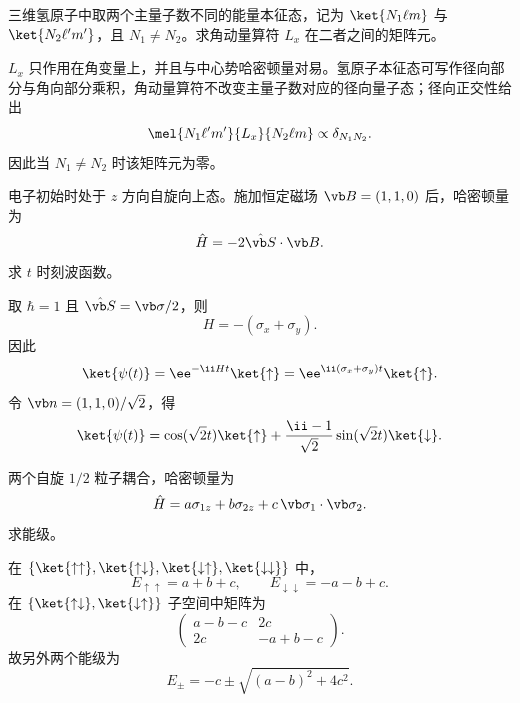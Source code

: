 \begin{question}
三维氢原子中取两个主量子数不同的能量本征态，记为 $\ket{N_1\ell m}$ 与 $\ket{N_2\ell' m'}$，且 $N_1\ne N_2$。求角动量算符 $L_x$ 在二者之间的矩阵元。
\begin{solution}
$L_x$ 只作用在角变量上，并且与中心势哈密顿量对易。氢原子本征态可写作径向部分与角向部分乘积，角动量算符不改变主量子数对应的径向量子态；径向正交性给出
\[
  \mel{N_1\ell'm'}{L_x}{N_2\ell m}\propto \delta_{N_1N_2}.
\]
因此当 $N_1\ne N_2$ 时该矩阵元为零。
\end{solution}
\end{question}

\begin{question}
电子初始时处于 $z$ 方向自旋向上态。施加恒定磁场 $\vb B=(1,1,0)$ 后，哈密顿量为
\[
  \hat H=-2\hat{\vb S}\cdot\vb B.
\]
求 $t$ 时刻波函数。
\begin{solution}
取 $\hbar=1$ 且 $\hat{\vb S}=\vb\sigma/2$，则
\[
  H=-(\sigma_x+\sigma_y).
\]
因此
\[
  \ket{\psi(t)}=\ee^{-\ii Ht}\ket{\uparrow}
  =\ee^{\ii(\sigma_x+\sigma_y)t}\ket{\uparrow}.
\]
令 $\vb n=(1,1,0)/\sqrt2$，得
\[
  \ket{\psi(t)}=\cos(\sqrt2 t)\ket{\uparrow}
  +{\ii-1\over\sqrt2}\sin(\sqrt2 t)\ket{\downarrow}.
\]
\end{solution}
\end{question}

\begin{question}
两个自旋 $1/2$ 粒子耦合，哈密顿量为
\[
  \hat H=a\sigma_{1z}+b\sigma_{2z}+c\,\vb\sigma_1\cdot\vb\sigma_2.
\]
求能级。
\begin{solution}
在 $\{\ket{\uparrow\uparrow},\ket{\uparrow\downarrow},\ket{\downarrow\uparrow},\ket{\downarrow\downarrow}\}$ 中，
\[
  E_{\uparrow\uparrow}=a+b+c,
  \qquad E_{\downarrow\downarrow}=-a-b+c.
\]
在 $\{\ket{\uparrow\downarrow},\ket{\downarrow\uparrow}\}$ 子空间中矩阵为
\[
  \begin{pmatrix}
  a-b-c&2c\\
  2c&-a+b-c
  \end{pmatrix}.
\]
故另外两个能级为
\[
  E_{\pm}=-c\pm\sqrt{(a-b)^2+4c^2}.
\]
\end{solution}
\end{question}

